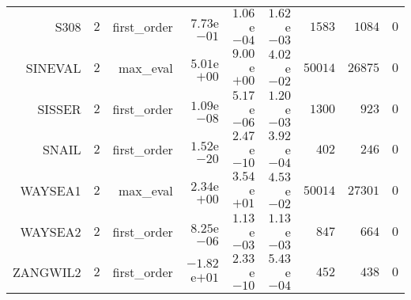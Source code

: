 \begin{longtable}{rrrrrrrrr}
S308 & \(     2\) & first\_order & \( 7.73\)e\(-01\) & \( 1.06\)e\(-04\) & \( 1.62\)e\(-03\) & \(  1583\) & \(  1084\) & \(     0\) \\
SINEVAL & \(     2\) & max\_eval & \( 5.01\)e\(+00\) & \( 9.00\)e\(+00\) & \( 4.02\)e\(-02\) & \( 50014\) & \( 26875\) & \(     0\) \\
SISSER & \(     2\) & first\_order & \( 1.09\)e\(-08\) & \( 5.17\)e\(-06\) & \( 1.20\)e\(-03\) & \(  1300\) & \(   923\) & \(     0\) \\
SNAIL & \(     2\) & first\_order & \( 1.52\)e\(-20\) & \( 2.47\)e\(-10\) & \( 3.92\)e\(-04\) & \(   402\) & \(   246\) & \(     0\) \\
WAYSEA1 & \(     2\) & max\_eval & \( 2.34\)e\(+00\) & \( 3.54\)e\(+01\) & \( 4.53\)e\(-02\) & \( 50014\) & \( 27301\) & \(     0\) \\
WAYSEA2 & \(     2\) & first\_order & \( 8.25\)e\(-06\) & \( 1.13\)e\(-03\) & \( 1.13\)e\(-03\) & \(   847\) & \(   664\) & \(     0\) \\
ZANGWIL2 & \(     2\) & first\_order & \(-1.82\)e\(+01\) & \( 2.33\)e\(-10\) & \( 5.43\)e\(-04\) & \(   452\) & \(   438\) & \(     0\) \\\hline
\end{longtable}
